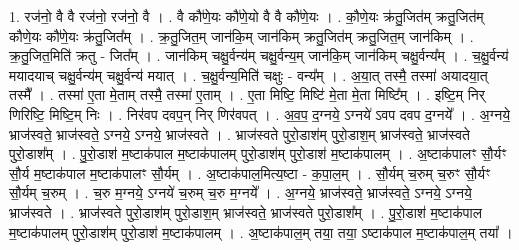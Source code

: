 \documentclass[17pt]{extarticle}
\begin{document}
1. रज॑नो॒ वै वै रज॑नो॒ रज॑नो॒ वै । . वै कौ॑णे॒यः कौ॑णे॒यो वै वै कौ॑णे॒यः । . कौ॒णे॒यः क्र॑तु॒जित॑म् क्रतु॒जित॑म् कौणे॒यः कौ॑णे॒यः क्र॑तु॒जित᳚म् । . क्र॒तु॒जित॒म् जान॑कि॒म् जान॑किम् क्रतु॒जित॑म् क्रतु॒जित॒म् जान॑किम् । . क्र॒तु॒जित॒मिति॑ क्रतु - जित᳚म् । . जान॑किम् चक्षु॒र्वन्य॑म् चक्षु॒र्वन्य॒म् जान॑कि॒म् जान॑किम् चक्षु॒र्वन्य᳚म् । . च॒क्षु॒र्वन्य॑ मयादयाच् चक्षु॒र्वन्य॑म् चक्षु॒र्वन्य॑ मयात् । . च॒क्षु॒र्वन्य॒मिति॑ चक्षुः - वन्य᳚म् । . अ॒या॒त् तस्मै॒ तस्मा॑ अयादया॒त् तस्मै᳚ । . तस्मा॑ ए॒ता मे॒ताम् तस्मै॒ तस्मा॑ ए॒ताम् । . ए॒ता मिष्टि॒ मिष्टि॑ मे॒ता मे॒ता मिष्टि᳚म् । . इष्टि॒म् निर् णिरिष्टि॒ मिष्टि॒म् निः । . निर॑वप दवप॒न् निर् णिर॑वपत् । . अ॒व॒प॒ द॒ग्नये॒ ऽग्नये॑ ऽवप दवप द॒ग्नये᳚ । . अ॒ग्नये॒ भ्राज॑स्वते॒ भ्राज॑स्वते॒ ऽग्नये॒ ऽग्नये॒ भ्राज॑स्वते । . भ्राज॑स्वते पुरो॒डाश॑म् पुरो॒डाश॒म् भ्राज॑स्वते॒ भ्राज॑स्वते पुरो॒डाश᳚म् । . पु॒रो॒डाश॑ म॒ष्टाक॑पाल म॒ष्टाक॑पालम् पुरो॒डाश॑म् पुरो॒डाश॑ म॒ष्टाक॑पालम् । . अ॒ष्टाक॑पालꣳ सौ॒र्यꣳ सौ॒र्य म॒ष्टाक॑पाल म॒ष्टाक॑पालꣳ सौ॒र्यम् । . अ॒ष्टाक॑पाल॒मित्य॒ष्टा - क॒पा॒ल॒म् । . सौ॒र्यम् च॒रुम् च॒रुꣳ सौ॒र्यꣳ सौ॒र्यम् च॒रुम् । . च॒रु म॒ग्नये॒ ऽग्नये॑ च॒रुम् च॒रु म॒ग्नये᳚ । . अ॒ग्नये॒ भ्राज॑स्वते॒ भ्राज॑स्वते॒ ऽग्नये॒ ऽग्नये॒ भ्राज॑स्वते । . भ्राज॑स्वते पुरो॒डाश॑म् पुरो॒डाश॒म् भ्राज॑स्वते॒ भ्राज॑स्वते पुरो॒डाश᳚म् । . पु॒रो॒डाश॑ म॒ष्टाक॑पाल म॒ष्टाक॑पालम् पुरो॒डाश॑म् पुरो॒डाश॑ म॒ष्टाक॑पालम् । . अ॒ष्टाक॑पाल॒म् तया॒ तया॒ ऽष्टाक॑पाल म॒ष्टाक॑पाल॒म् तया᳚ । \newline
\end{document}
